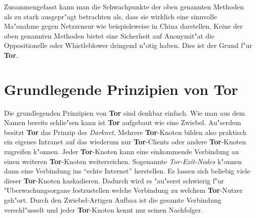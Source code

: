 \documentclass[titlepage]{article}
\begin{document}
Zusammengefasst kann man die Schwachpunkte der oben genannten Methoden als zu stark ausgepr"agt betrachten als, dass sie wirklich eine sinnvolle Ma"snahme gegen Netzzensur wie beispielsweise in China darstellen. Keine der oben genannten Methoden bietet eine Sicherheit auf Anonymit"at die Oppositionelle oder Whistleblower dringend n"otig haben.
\newline
Dies ist der Grund f"ur \textbf{Tor}.

\newpage
\section{Grundlegende Prinzipien von Tor}
Die grundlegenden Prinzipien von \textbf{Tor} sind denkbar einfach. Wie man aus dem Namen bereits schlie"sen kann ist \textbf{Tor} aufgebaut wie eine Zwiebel. Au"serdem besitzt \textbf{Tor} das Prinzip des \textit{Darknet}. Mehrere \textbf{Tor}-Knoten bilden also praktisch ein eigenes Intranet auf das wiederum nur \textbf{Tor}-Clients oder andere \textbf{Tor}-Knoten zugreifen k"onnen. Jeder \textbf{Tor}-Knoten kann eine einkommende Verbindung an einen weiteren \textbf{Tor}-Knoten weiterreichen. Sogenannte \textit{Tor-Exit-Nodes} k"onnen dann eine Verbindung ins ``echte Internet'' herstellen. Es lassen sich beliebig viele dieser \textbf{Tor}-Knoten kaskadieren. Dadurch wird es "au"serst schwierig f"ur "Uberwachungsorgane festzustellen welche Verbindung zu welchem \textbf{Tor}-Nutzer geh"ort. Durch den Zwiebel-Artigen Aufbau ist die gesamte Verbindung verschl"usselt und jeder \textbf{Tor}-Knoten kennt nur seinen Nachfolger.
\end{document}
